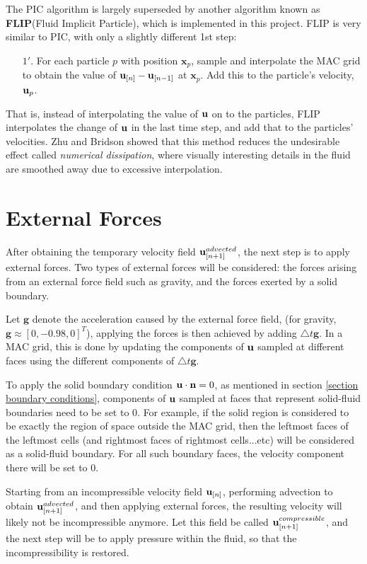 The PIC algorithm is largely superseded by another algorithm known as \textbf{FLIP}(Fluid Implicit Particle), which is implemented in this project. FLIP is very similar to PIC, with only a slightly different 1st step:
\begin{enumerate}
    \item [$1'.$]
    For each particle $p$ with position $\textbf{x}_p$, sample and interpolate the MAC grid to obtain the value of $\textbf{u}_{[n]} - \textbf{u}_{[n-1]}$ at $\textbf{x}_p$. Add this to the particle's velocity,  $\textbf{u}_p$.
\end{enumerate}
That is, instead of interpolating the value of $\textbf{u}$ on to the particles, FLIP interpolates the change of $\textbf{u}$ in the last time step, and add that to the particles' velocities. Zhu and Bridson \cite{zhu2005animating} showed that this method reduces the undesirable effect called \textit{numerical dissipation}, where visually interesting details in the fluid are smoothed away due to excessive interpolation.



\section{External Forces}

After obtaining the temporary velocity field $\textbf{u}_{[n+1]}^{advected}$, the next step is to apply external forces. Two types of external forces will be considered: the forces arising from an external force field such as gravity, and the forces exerted by a solid boundary.

Let $\textbf{g}$ denote the acceleration caused by the external force field, (for gravity, $\textbf{g}\approx[0,-0.98,0]^T$), applying the forces is then achieved by adding $\triangle t \textbf{g}$. In a MAC grid, this is done by updating the components of $\textbf{u}$ sampled at different faces using the different components of $\triangle t \textbf{g}$. 


To apply the solid boundary condition $\textbf{u} \cdot \textbf{n} = 0$, as mentioned in section \ref{section boundary conditions}, components of $\textbf{u}$ sampled at faces that represent solid-fluid boundaries need to be set to 0. For example, if the solid region is considered to be exactly the region of space outside the MAC grid, then the leftmost faces of the leftmost cells (and rightmost faces of rightmost cells...etc) will be considered as a solid-fluid boundary. For all such boundary faces, the velocity component there will be set to 0. 

Starting from an incompressible velocity field $\textbf{u}_{[n]}$, performing advection to obtain $\textbf{u}_{[n+1]}^{advected}$, and then applying external forces, the resulting velocity will likely not be incompressible anymore. Let this field be called $\textbf{u}_{[n+1]}^{compressible}$, and the next step will be to apply pressure within the fluid, so that the incompressibility is restored.


